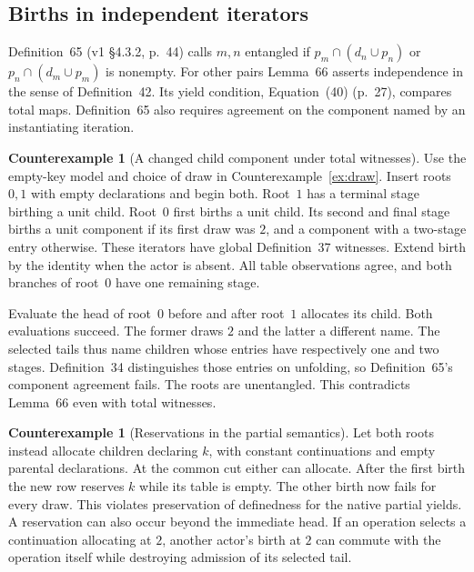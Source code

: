 \documentclass[11pt,a4paper]{article}
\theoremstyle{definition}
\newtheorem{counterexample}[definition]{Counterexample}
\theoremstyle{plain}
\begin{document}
\subsection{Births in independent iterators}
\label{sec:pairwise}

Definition~65 (v1 \S4.3.2, p.~44) calls $m,n$ entangled if $p_m\cap(d_n\cup p_n)$ or $p_n\cap(d_m\cup p_m)$ is nonempty. For other pairs Lemma~66 asserts independence in the sense of Definition~42. Its yield condition, Equation~(40) (p.~27), compares total maps. Definition~65 also requires agreement on the component named by an instantiating iteration.

\begin{counterexample}[A changed child component under total witnesses]
Use the empty-key model and choice of draw in Counterexample~\ref{ex:draw}. Insert roots $0,1$ with empty declarations and begin both. Root~$1$ has a terminal stage birthing a unit child. Root~$0$ first births a unit child. Its second and final stage births a unit component if its first draw was $2$, and a component with a two-stage entry otherwise.
These iterators have global Definition~37 witnesses. Extend birth by the identity when the actor is absent. All table observations agree, and both branches of root~$0$ have one remaining stage.

Evaluate the head of root~$0$ before and after root~$1$ allocates its child. Both evaluations succeed. The former draws $2$ and the latter a different name. The selected tails thus name children whose entries have respectively one and two stages. Definition~34 distinguishes those entries on unfolding, so Definition~65's component agreement fails. The roots are unentangled. This contradicts Lemma~66 even with total witnesses.
\end{counterexample}

\begin{counterexample}[Reservations in the partial semantics]
Let both roots instead allocate children declaring $k$, with constant continuations and empty parental declarations. At the common cut either can allocate. After the first birth the new row reserves $k$ while its table is empty. The other birth now fails for every draw. This violates preservation of definedness for the native partial yields.
A reservation can also occur beyond the immediate head. If an operation selects a continuation allocating at $2$, another actor's birth at $2$ can commute with the operation itself while destroying admission of its selected tail.
\end{counterexample}
\end{document}
